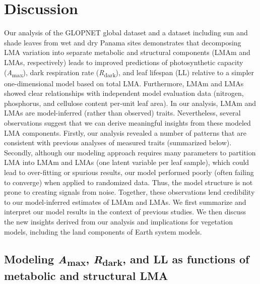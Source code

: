 \documentclass[
  12pt,
  a4paper,
,tablecaptionabove
]{scrartcl}
\begin{document}
\hypertarget{discussion}{%
\section{Discussion}\label{discussion}}

Our analysis of the GLOPNET global dataset and a dataset including sun
and shade leaves from wet and dry Panama sites demonstrates that
decomposing LMA variation into separate metabolic and structural
components (LMAm and LMAs, respectively) leads to improved predictions
of photosynthetic capacity (\emph{A}\textsubscript{max}), dark
respiration rate (\emph{R}\textsubscript{dark}), and leaf lifespan (LL)
relative to a simpler one-dimensional model based on total LMA.
Furthermore, LMAm and LMAs showed clear relationships with independent
model evaluation data (nitrogen, phosphorus, and cellulose content
per-unit leaf area). In our analysis, LMAm and LMAs are model-inferred
(rather than observed) traits. Nevertheless, several observations
suggest that we can derive meaningful insights from these modeled LMA
components. Firstly, our analysis revealed a number of patterns that are
consistent with previous analyses of measured traits (summarized below).
Secondly, although our modeling approach requires many parameters to
partition LMA into LMAm and LMAs (one latent variable per leaf sample),
which could lead to over-fitting or spurious results, our model
performed poorly (often failing to converge) when applied to randomized
data. Thus, the model structure is not prone to creating signals from
noise. Together, these observations lend credibility to our
model-inferred estimates of LMAm and LMAs. We first summarize and
interpret our model results in the context of previous studies. We then
discuss the new insights derived from our analysis and implications for
vegetation models, including the land components of Earth system models.

\hypertarget{modeling-amax-rdark-and-ll-as-functions-of-metabolic-and-structural-lma}{%
\subsection{\texorpdfstring{Modeling \emph{A}\textsubscript{max},
\emph{R}\textsubscript{dark}, and LL as functions of metabolic and
structural
LMA}{Modeling Amax, Rdark, and LL as functions of metabolic and structural LMA}}\label{modeling-amax-rdark-and-ll-as-functions-of-metabolic-and-structural-lma}}
\end{document}

